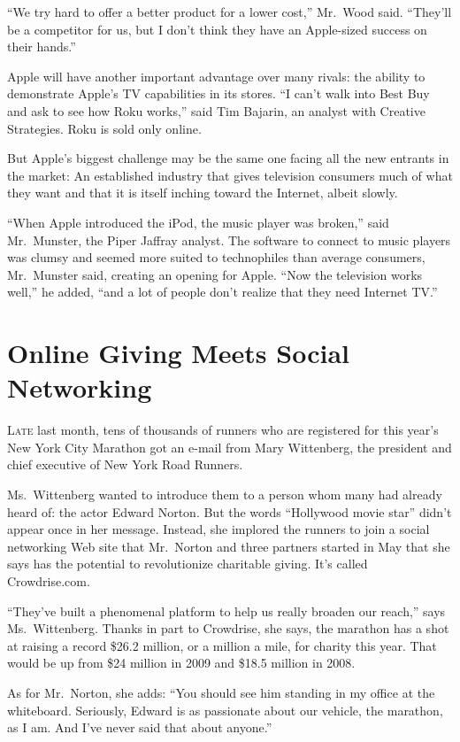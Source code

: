 ﻿\documentclass[12pt]{article}
\begin{document}
``We try hard to offer a better product for a lower cost,'' Mr.~Wood said. ``They'll be a competitor
for us, but I don't think they have an Apple-sized success on their hands.''

Apple will have another important advantage over many rivals: the ability to demonstrate Apple's TV
capabilities in its stores. ``I can't walk into Best Buy and ask to see how Roku works,'' said Tim
Bajarin, an analyst with Creative Strategies. Roku is sold only online.

But Apple's biggest challenge may be the same one facing all the new entrants in the market: An
established industry that gives television consumers much of what they want and that it is itself
inching toward the Internet, albeit slowly.

``When Apple introduced the iPod, the music player was broken,'' said Mr.~Munster, the Piper Jaffray
analyst. The software to connect to music players was clumsy and seemed more suited to technophiles
than average consumers, Mr.~Munster said, creating an opening for Apple. ``Now the television works
well,'' he added, ``and a lot of people don't realize that they need Internet TV.''

\pagebreak
\section{Online Giving Meets Social Networking}

\lettrine{L}{ate} last month, tens of thousands of runners who are
registered for this year's New York City Marathon got an e-mail from Mary Wittenberg, the president
and chief executive of New York Road Runners.

Ms.~Wittenberg wanted to introduce them to a person whom many had already heard of: the actor Edward
Norton. But the words ``Hollywood movie star'' didn't appear once in her message. Instead, she
implored the runners to join a social networking Web site that Mr.~Norton and three partners started
in May that she says has the potential to revolutionize charitable giving. It's called
Crowdrise.com.

``They've built a phenomenal platform to help us really broaden our reach,'' says Ms.~Wittenberg.
Thanks in part to Crowdrise, she says, the marathon has a shot at raising a record \$26.2 million,
or a million a mile, for charity this year. That would be up from \$24 million in 2009 and \$18.5
million in 2008.

As for Mr.~Norton, she adds: ``You should see him standing in my office at the whiteboard.
Seriously, Edward is as passionate about our vehicle, the marathon, as I am. And I've never said
that about anyone.''
\end{document}

